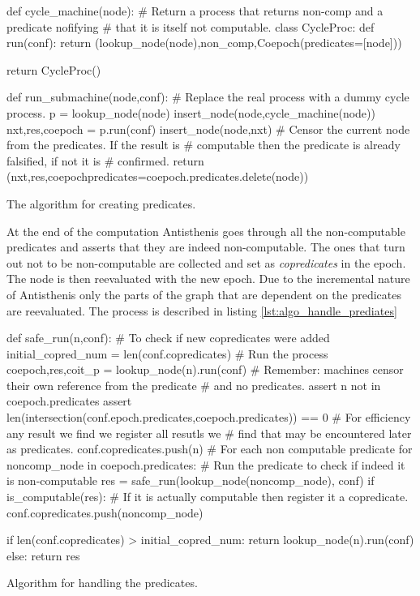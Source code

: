 \begin{code}
\begin{pycode}
def cycle_machine(node):
    # Return a process that returns non-comp and a predicate nofifying
    # that it is itself not computable.
    class CycleProc:
        def run(conf):
           return (lookup_node(node),non_comp,Coepoch(predicates=[node]))

    return CycleProc()

def run_submachine(node,conf):
    # Replace the real process with a dummy cycle process.
    p = lookup_node(node)
    insert_node(node,cycle_machine(node))
    nxt,res,coepoch = p.run(conf)
    insert_node(node,nxt)
    # Censor the current node from the predicates. If the result is
    # computable then the predicate is already falsified, if not it is
    # confirmed.
    return (nxt,res,coepoch{predicates=coepoch.predicates.delete(node)})
\end{pycode}
  \caption{\label{lst:algo_create_predicates}The algorithm for
    creating predicates.}
\end{code}

At the end of the computation Antisthenis goes through all the
non-computable predicates and asserts that they are indeed
non-computable. The ones that turn out not to be non-computable are
collected and set as \emph{copredicates} in the epoch. The node is
then reevaluated with the new epoch. Due to the incremental nature of
Antisthenis only the parts of the graph that are dependent on the
predicates are reevaluated. The process is described in listing
\ref{lst:algo_handle_prediates}

\begin{code}
\begin{pycode}
def safe_run(n,conf):
    # To check if new copredicates were added
    initial_copred_num = len(conf.copredicates)
    # Run the process
    coepoch,res,coit_p = lookup_node(n).run(conf)
    # Remember: machines censor their own reference from the predicate
    # and no predicates.
    assert n not in coepoch.predicates
    assert len(intersection(conf.epoch.predicates,coepoch.predicates)) == 0
    # For efficiency any result we find we register all resutls we
    # find that may be encountered later as predicates.
    conf.copredicates.push(n)
    # For each non computable predicate
    for noncomp_node in coepoch.predicates:
        # Run the predicate to check if indeed it is non-computable
        res = safe_run(lookup_node(noncomp_node), conf)
        if is_computable(res):
            # If it is actually computable then register it a copredicate.
            conf.copredicates.push(noncomp_node)

    if len(conf.copredicates) > initial_copred_num:
        return lookup_node(n).run(conf)
    else:
        return res
\end{pycode}
  \caption{\label{lst:algo_handle_prediates}Algorithm for handling the
    predicates.}
\end{code}

